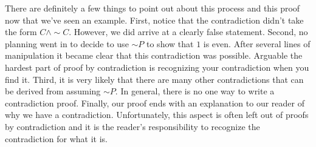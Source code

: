\documentclass[12 pt]{article}
\theoremstyle{definition}
\theoremstyle{plain}
\theoremstyle{mytheorem}
\theoremstyle{myexample}
\theoremstyle{mydefinition}
\begin{document}
\noindent  There are definitely a few things to point out about this process and this proof now that we've seen an example.  First, notice that the contradiction didn't take the form $C \wedge \sim C$.  However, we did arrive at a clearly false statement.  Second, no planning went in to decide to use $\sim P$ to show that $1$ is even.  After several lines of manipulation it became clear that this contradiction was possible.  Arguable the hardest part of proof by contradiction is recognizing your contradiction when you find it.  Third, it is very likely that there are many other contradictions that can be derived from assuming $\sim P$.  In general, there is no one way to write a contradiction proof.  Finally, our proof ends with an explanation to our reader of why we have a contradiction.  Unfortunately, this aspect is often left out of proofs by contradiction and it is the reader's responsibility to recognize the contradiction for what it is.\\
\end{document}
